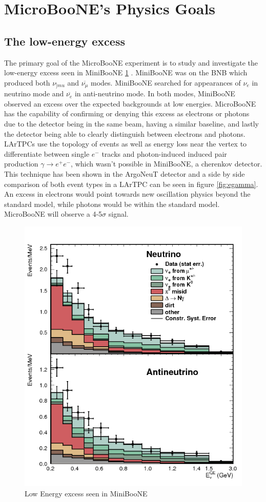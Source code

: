 \section{MicroBooNE's Physics Goals} 
\subsection{The low-energy excess}
The primary goal of the MicroBooNE experiment is to study and investigate the low-energy excess seen in MiniBooNE \ref{fig:lee} \cite{miniboone1} \cite{miniboone2}. MiniBooNE was on the BNB which produced both $\nu_{]mu}$ and $\overline{\nu_{\mu}}$ modes. MiniBooNE searched for appearances of $\nu_e$ in neutrino mode and $\overline{\nu_e}$ in anti-neutrino mode. In both modes, MiniBooNE observed an excess over the expected backgrounds at low energies.  MicroBooNE has the capability of confirming or denying this excess as electrons or photons due to the detector being in the same beam, having a similar baseline, and lastly the detector being able to clearly distinguish between electrons and photons. LArTPCs use the topology of events as well as energy loss near the vertex to differentiate between single $e^-$ tracks and photon-induced induced pair production $\gamma \rightarrow e^+e^-$, which wasn't possible in MiniBooNE, a cherenkov detector. This technique has been shown in the ArgoNeuT detector and a side by side comparison of both event types in a LArTPC can be seen in figure \ref{fig:egamma}. An excess in electrons would point towards new oscillation physics beyond the standard model, while photons would be within the standard model. MicroBooNE will observe a 4-5$\sigma$ signal.  

\begin{figure}[htp!]
\centering
\includegraphics[width=.5\textwidth]{figs/lee.png}
\caption{Low Energy excess seen in MiniBooNE \cite{miniboone1}}
\label{fig:lee}
\end{figure}

